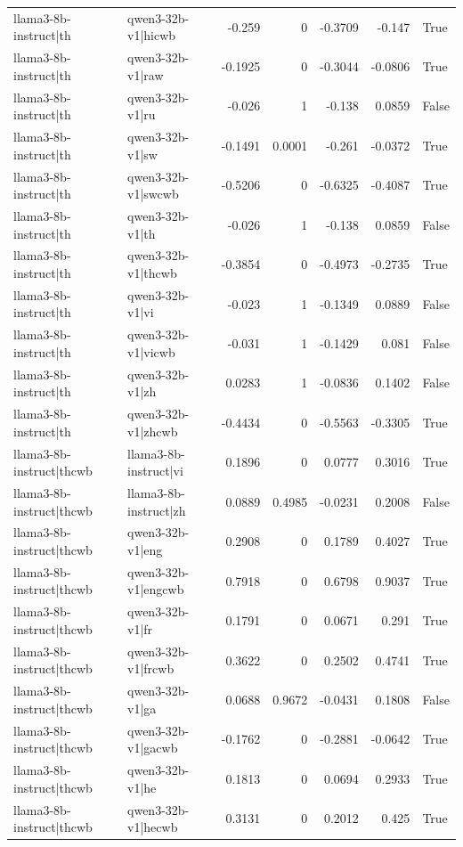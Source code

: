 \begin{table}
\begin{tabular}{l l r r r r l}
llama3-8b-instruct|th & qwen3-32b-v1|hicwb & -0.259 & 0 & -0.3709 & -0.147 & True \\
llama3-8b-instruct|th & qwen3-32b-v1|raw & -0.1925 & 0 & -0.3044 & -0.0806 & True \\
llama3-8b-instruct|th & qwen3-32b-v1|ru & -0.026 & 1 & -0.138 & 0.0859 & False \\
llama3-8b-instruct|th & qwen3-32b-v1|sw & -0.1491 & 0.0001 & -0.261 & -0.0372 & True \\
llama3-8b-instruct|th & qwen3-32b-v1|swcwb & -0.5206 & 0 & -0.6325 & -0.4087 & True \\
llama3-8b-instruct|th & qwen3-32b-v1|th & -0.026 & 1 & -0.138 & 0.0859 & False \\
llama3-8b-instruct|th & qwen3-32b-v1|thcwb & -0.3854 & 0 & -0.4973 & -0.2735 & True \\
llama3-8b-instruct|th & qwen3-32b-v1|vi & -0.023 & 1 & -0.1349 & 0.0889 & False \\
llama3-8b-instruct|th & qwen3-32b-v1|vicwb & -0.031 & 1 & -0.1429 & 0.081 & False \\
llama3-8b-instruct|th & qwen3-32b-v1|zh & 0.0283 & 1 & -0.0836 & 0.1402 & False \\
llama3-8b-instruct|th & qwen3-32b-v1|zhcwb & -0.4434 & 0 & -0.5563 & -0.3305 & True \\
llama3-8b-instruct|thcwb & llama3-8b-instruct|vi & 0.1896 & 0 & 0.0777 & 0.3016 & True \\
llama3-8b-instruct|thcwb & llama3-8b-instruct|zh & 0.0889 & 0.4985 & -0.0231 & 0.2008 & False \\
llama3-8b-instruct|thcwb & qwen3-32b-v1|eng & 0.2908 & 0 & 0.1789 & 0.4027 & True \\
llama3-8b-instruct|thcwb & qwen3-32b-v1|engcwb & 0.7918 & 0 & 0.6798 & 0.9037 & True \\
llama3-8b-instruct|thcwb & qwen3-32b-v1|fr & 0.1791 & 0 & 0.0671 & 0.291 & True \\
llama3-8b-instruct|thcwb & qwen3-32b-v1|frcwb & 0.3622 & 0 & 0.2502 & 0.4741 & True \\
llama3-8b-instruct|thcwb & qwen3-32b-v1|ga & 0.0688 & 0.9672 & -0.0431 & 0.1808 & False \\
llama3-8b-instruct|thcwb & qwen3-32b-v1|gacwb & -0.1762 & 0 & -0.2881 & -0.0642 & True \\
llama3-8b-instruct|thcwb & qwen3-32b-v1|he & 0.1813 & 0 & 0.0694 & 0.2933 & True \\
llama3-8b-instruct|thcwb & qwen3-32b-v1|hecwb & 0.3131 & 0 & 0.2012 & 0.425 & True \\

\end{tabular}
\end{table}
